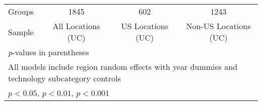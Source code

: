{\begin{longtable}{l*{3}{c}}
Groups          &     1845         &      602         &     1243         \\
Sample          &All Locations (UC)         &US Locations (UC)         &Non-US Locations (UC)         \\
\hline\hline
\multicolumn{4}{l}{\footnotesize \textit{p}-values in parentheses}\\
\multicolumn{4}{l}{\footnotesize All models include region random effects with year dummies and technology subcategory controls}\\
\multicolumn{4}{l}{\footnotesize \sym{*} \(p<0.05\), \sym{**} \(p<0.01\), \sym{***} \(p<0.001\)}\\
\end{longtable}
}
